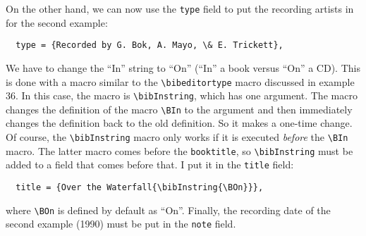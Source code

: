 \documentclass{article}
\newcommand{\BOn}{On}
\newcommand{\bibeditortype}[1]{\relax}%
\newcommand{\bibInstring}[1]{%
  \global\let\oldBIn\BIn
  \global\def\BIn{#1\global\let\BIn\oldBIn}%
}
\newcommand{\fieldname}[1]{\texttt{#1}}%
\begin{document}
\begin{enumerate}
      On the other hand, we can now use the \fieldname{type}
      field to put the recording artists in for the second example:
\begin{verbatim}
  type = {Recorded by G. Bok, A. Mayo, \& E. Trickett},
\end{verbatim}
      We have to change the ``In'' string to ``On''
      (``In'' a book versus ``On'' a CD). This is done with a
      macro similar to the \verb+\bibeditortype+ macro discussed
      in example 36. In this case, the macro is \verb+\bibInstring+,
      which has one argument. The macro changes the definition of
      the macro \verb+\BIn+ to the argument and then immediately changes
      the definition back to the old definition. So it makes a one-time
      change. Of course, the \verb+\bibInstring+ macro only works
      if it is executed \emph{before} the \verb+\BIn+ macro. The latter
      macro comes before the \fieldname{booktitle}, so
      \verb+\bibInstring+ must be added to a field that comes before
      that. I put it in the \fieldname{title} field:
\begin{verbatim}
  title = {Over the Waterfall{\bibInstring{\BOn}}},
\end{verbatim}
      where \verb+\BOn+ is defined by default as ``\BOn''.
      Finally, the recording date of the second example (1990) must
      be put in the \fieldname{note} field.


\end{enumerate}
\end{document}
